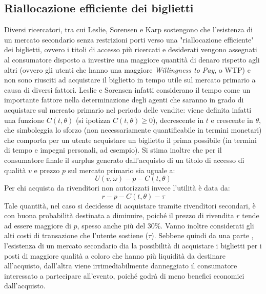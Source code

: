 \subsection{Riallocazione efficiente dei biglietti}
Diversi ricercatori, tra cui Leslie, Sorensen \cite{leslie2013resale} e Karp \cite{karp2005promoters} sostengono che l'esistenza di un mercato secondario senza restrizioni porti verso una "riallocazione efficiente" dei biglietti, ovvero i titoli di accesso più ricercati e desiderati vengono assegnati al consumatore disposto a investire una maggiore quantità di denaro rispetto agli altri (ovvero gli utenti che hanno una maggiore \textit{Willingness to Pay}, o WTP) e non sono riusciti ad acquistare il biglietto in tempo utile sul mercato primario a causa di diversi fattori. Leslie e Sorensen infatti considerano il tempo come un importante fattore nella determinazione degli agenti che saranno in grado di acquistare sul mercato primario nel periodo delle vendite: viene definita infatti una funzione $C(t, \theta)$ (si ipotizza $C(t, \theta) \geq{0} $), decrescente in $t$ e crescente in $\theta$, che simboleggia lo sforzo (non necessariamente quantificabile in termini monetari) che comporta per un utente acquistare un biglietto il prima possibile (in termini di tempo e impegni personali, ad esempio). Si stima inoltre che per il consumatore finale il surplus generato dall'acquisto di un titolo di accesso di qualità $v$ e prezzo $p$ sul mercato primario sia uguale a: 
\begin{equation}
	U(v, \omega) - p - C(t, \theta)
\end{equation}
Per chi acquista da rivenditori non autorizzati invece l'utilità è data da: 
\begin{equation}
	r - p - C(t, \theta) - \tau
\end{equation}
Tale quantità, nel caso si decidesse di acquistare tramite rivenditori secondari, è con buona probabilità destinata a diminuire, poiché il prezzo di rivendita $r$ tende ad essere maggiore di $p$, spesso anche più del 30\%. Vanno inoltre considerati gli alti costi di transazione che l'utente sostiene ($\tau$). Sebbene quindi da una parte , l'esistenza di un mercato secondario dia la possibilità di acquistare i biglietti per i posti di maggiore qualità a coloro che hanno più liquidità da destinare all'acquisto, dall'altra viene irrimediabilmente danneggiato il consumatore interessato a partecipare all'evento, poiché godrà di meno benefici economici dall'acquisto. 

